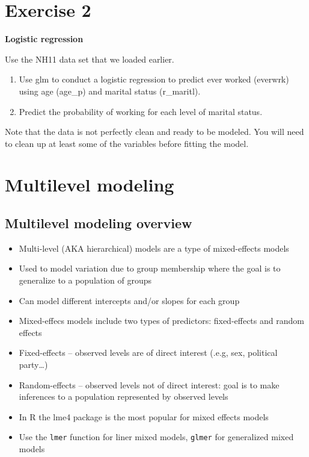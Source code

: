 \documentclass[]{book}
\providecommand{\tightlist}{%
  \setlength{\itemsep}{0pt}\setlength{\parskip}{0pt}}
\begin{document}
\section{Exercise 2}\label{exercise-2-1}

\textbf{Logistic regression}

Use the NH11 data set that we loaded earlier.

\begin{enumerate}
\def\labelenumi{\arabic{enumi}.}
\tightlist
\item
  Use glm to conduct a logistic regression to predict ever worked
  (everwrk) using age (age\_p) and marital status (r\_maritl).
\item
  Predict the probability of working for each level of marital status.
\end{enumerate}

Note that the data is not perfectly clean and ready to be modeled. You
will need to clean up at least some of the variables before fitting the
model.

\section{Multilevel modeling}\label{multilevel-modeling}

\subsection{Multilevel modeling
overview}\label{multilevel-modeling-overview}

\begin{itemize}
\tightlist
\item
  Multi-level (AKA hierarchical) models are a type of mixed-effects
  models
\item
  Used to model variation due to group membership where the goal is to
  generalize to a population of groups
\item
  Can model different intercepts and/or slopes for each group
\item
  Mixed-effecs models include two types of predictors: fixed-effects and
  random effects
\item
  Fixed-effects -- observed levels are of direct interest (.e.g, sex,
  political party\ldots{})
\item
  Random-effects -- observed levels not of direct interest: goal is to
  make inferences to a population represented by observed levels
\item
  In R the lme4 package is the most popular for mixed effects models
\item
  Use the \texttt{lmer} function for liner mixed models, \texttt{glmer}
  for generalized mixed models
\end{itemize}
\end{document}
